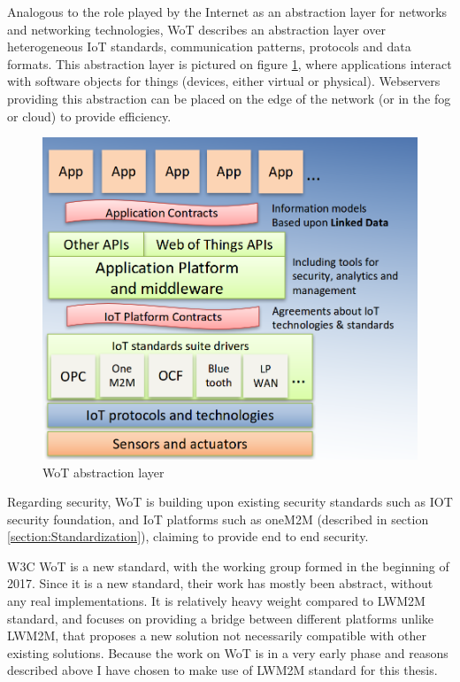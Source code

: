 Analogous to the role played by the Internet as an abstraction layer for networks and networking technologies, WoT describes an abstraction layer over heterogeneous IoT standards, communication patterns, protocols and data formats. This abstraction layer is pictured on figure \ref{fig:WOT}, where applications interact with software objects for things (devices, either virtual or physical). Webservers providing this abstraction can be placed on the edge of the network (or in the fog or cloud) to provide efficiency.

\begin{figure}[ht]
	\begin{center}
		\includegraphics[width=\textwidth]{images/WOT}
		\caption{WoT abstraction layer}
		\label{fig:WOT}
	\end{center}
\end{figure}

Regarding security, WoT is building upon existing security standards such as IOT security foundation, and IoT platforms such as oneM2M (described in section \ref{section:Standardization}), claiming to provide end to end security. 

W3C WoT is a new standard, with the working group formed in the beginning of 2017. Since it is a new standard, their work has mostly been abstract, without any real implementations. It is relatively heavy weight compared to LWM2M standard, and focuses on providing a bridge between different platforms unlike LWM2M, that proposes a new solution not necessarily compatible with other existing solutions. Because the work on WoT is in a very early phase and reasons described above I have chosen to make use of LWM2M standard for this thesis.

